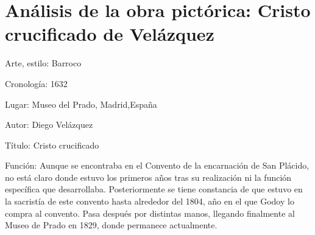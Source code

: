 \section{Análisis de la obra pictórica: Cristo crucificado de Velázquez } 

Arte, estilo: Barroco

Cronología: 1632

Lugar: Museo del Prado, Madrid,España

Autor: Diego Velázquez

Título: Cristo crucificado

Función: Aunque se encontraba en el Convento de la encarnación de San Plácido, no está claro donde estuvo los primeros años tras su realización ni la función específica que desarrollaba. Posteriormente se tiene constancia de que estuvo en la sacristía de este convento hasta alrededor del 1804, año en el que Godoy lo compra al convento. Pasa después por distintas manos, llegando finalmente al Museo de Prado en 1829, donde permanece actualmente. %


